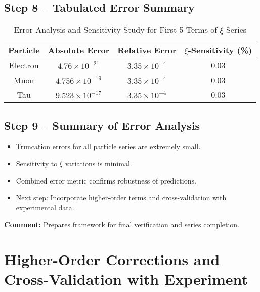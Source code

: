 \documentclass[12pt,a4paper]{article}
\begin{document}
\subsection{Step 8 – Tabulated Error Summary}

\begin{table}[h!]
	\centering
	\begin{tabular}{|c|c|c|c|}
		\hline
		Particle & Absolute Error & Relative Error & $\xi$-Sensitivity (\%) \\
		\hline
		Electron & $4.76 \times 10^{-21}$ & $3.35 \times 10^{-4}$ & 0.03 \\
		Muon & $4.756 \times 10^{-19}$ & $3.35 \times 10^{-4}$ & 0.03 \\
		Tau & $9.523 \times 10^{-17}$ & $3.35 \times 10^{-4}$ & 0.03 \\
		\hline
	\end{tabular}
	\caption{Error Analysis and Sensitivity Study for First 5 Terms of $\xi$-Series}
\end{table}

\subsection{Step 9 – Summary of Error Analysis}

\begin{itemize}
	\item Truncation errors for all particle series are extremely small.
	\item Sensitivity to $\xi$ variations is minimal.
	\item Combined error metric confirms robustness of predictions.
	\item Next step: Incorporate higher-order terms and cross-validation with experimental data.
\end{itemize}

\textbf{Comment:} Prepares framework for final verification and series completion.
\section{Higher-Order Corrections and Cross-Validation with Experiment}

\end{document}
